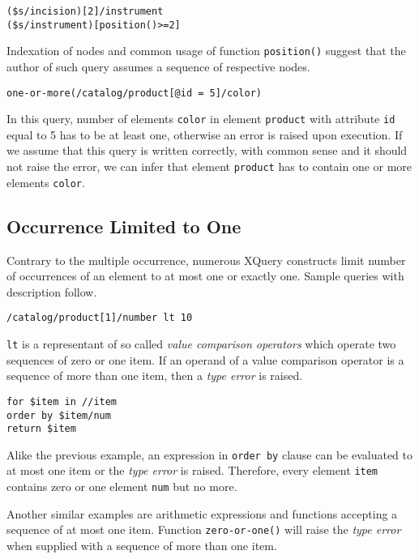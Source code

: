 \begin{verbatim}
($s/incision)[2]/instrument
($s/instrument)[position()>=2]
\end{verbatim}

Indexation of nodes and common usage of function \texttt{position()} suggest that the author of such query assumes a sequence of respective nodes.

\begin{verbatim}
one-or-more(/catalog/product[@id = 5]/color)
\end{verbatim}

In this query, number of elements \texttt{color} in element \texttt{product} with attribute \texttt{id} equal to 5 has to be at least one, otherwise an error is raised upon execution. If we assume that this query is written correctly, with common sense and it should not raise the error, we can infer that element \texttt{product} has to contain one or more elements \texttt{color}.

\subsection{Occurrence Limited to One}
Contrary to the multiple occurrence, numerous XQuery constructs limit number of occurrences of an element to at most one or exactly one. Sample queries with description follow.

\begin{verbatim}
/catalog/product[1]/number lt 10
\end{verbatim}

\texttt{lt} is a representant of so called \emph{value comparison operators}  which operate two sequences of zero or one item. If an operand of a value comparison operator is a sequence of more than one item, then a \emph{type error}  is raised.

\begin{verbatim}
for $item in //item 
order by $item/num 
return $item
\end{verbatim}

Alike the previous example, an expression in \texttt{order by} clause can be evaluated to at most one item or the \emph{type error} is raised. Therefore, every element \texttt{item} contains zero or one element \texttt{num} but no more.

Another similar examples are arithmetic expressions and functions accepting a sequence of at most one item. Function \texttt{zero-or-one()} will raise the \emph{type error} when supplied with a sequence of more than one item.

